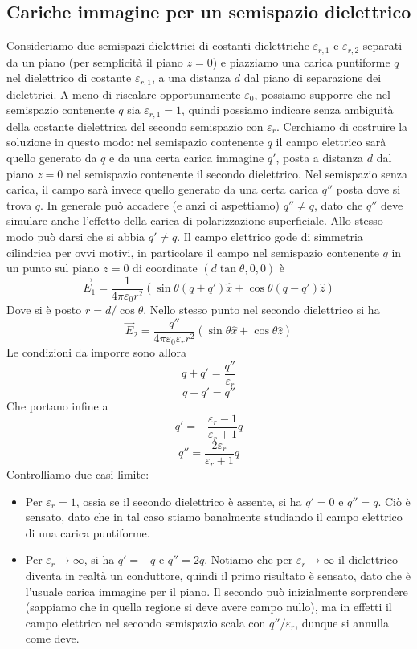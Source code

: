 \documentclass[a4paper,11pt]{book}
\let\oldepsilon\epsilon
\let\oldvarepsilon\varepsilon
\renewcommand{\epsilon}{\oldvarepsilon}
\renewcommand{\varepsilon}{\oldepsilon}
\theoremstyle{definition}
\theoremstyle{theorem}
\begin{document}
\subsection{Cariche immagine per un semispazio dielettrico}
	Consideriamo due semispazi dielettrici di costanti dielettriche $\epsilon_{r,1}$ e $\epsilon_{r,2}$ separati da un piano (per semplicità il piano $z=0$) e piazziamo una carica puntiforme $q$ nel dielettrico di costante $\epsilon_{r,1}$, a una distanza $d$ dal piano di separazione dei dielettrici. A meno di riscalare opportunamente $\epsilon_0$, possiamo supporre che nel semispazio contenente $q$ sia $\epsilon_{r,1}=1$, quindi possiamo indicare senza ambiguità della costante dielettrica del secondo semispazio con $\epsilon_r$. Cerchiamo di costruire la soluzione in questo modo: nel semispazio contenente $q$ il campo elettrico sarà quello generato da $q$ e da una certa carica immagine $q'$, posta a distanza $d$ dal piano $z=0$ nel semispazio contenente il secondo dielettrico. Nel semispazio senza carica, il campo sarà invece quello generato da una certa carica $q''$ posta dove si trova $q$. In generale può accadere (e anzi ci aspettiamo) $q''\neq q$, dato che $q''$ deve simulare anche l'effetto della carica di polarizzazione superficiale. Allo stesso modo può darsi che si abbia $q'\neq q$. Il campo elettrico gode di simmetria cilindrica per ovvi motivi, in particolare il campo nel semispazio contenente $q$ in un punto sul piano $z=0$ di coordinate $(d\tan\theta,0,0)$ è
	\[\vec{E}_1=\frac{1}{4\pi\epsilon_0 r^2}\left(\sin\theta(q+q')\hat{x}+\cos\theta(q-q')\hat{z}\right)\]
	Dove si è posto $r=d/\cos\theta$. Nello stesso punto nel secondo dielettrico si ha
	\[\vec{E}_2=\frac{q''}{4\pi\epsilon_0\epsilon_rr^2}\left(\sin\theta\hat{x}+\cos\theta\hat{z}\right)\]
	Le condizioni da imporre sono allora
	\[q+q'=\frac{q''}{\epsilon_r}\]
	\[q-q'=q''\]
	Che portano infine a
	\[q'=-\frac{\epsilon_r-1}{\epsilon_r+1}q\]
	\[q''=\frac{2\epsilon_r}{\epsilon_r+1}q\]
	Controlliamo due casi limite:
	\begin{itemize}
		\item Per $\epsilon_r=1$, ossia se il secondo dielettrico è assente, si ha $q'=0$ e $q''=q$. Ciò è sensato, dato che in tal caso stiamo banalmente studiando il campo elettrico di una carica puntiforme.
		\item Per $\epsilon_r\to\infty$, si ha $q'=-q$ e $q''=2q$. Notiamo che per $\epsilon_r\to\infty$ il dielettrico diventa in realtà un conduttore, quindi il primo risultato è sensato, dato che è l'usuale carica immagine per il piano. Il secondo può inizialmente sorprendere (sappiamo che in quella regione si deve avere campo nullo), ma in effetti il campo elettrico nel secondo semispazio scala con $q''/\epsilon_r$, dunque si annulla come deve.
	\end{itemize}
\end{document}
